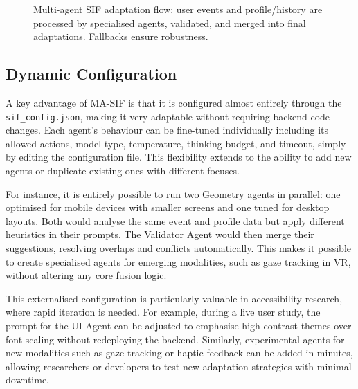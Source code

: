 \begin{figure}[ht]
\caption{Multi-agent SIF adaptation flow: user events and profile/history are processed by specialised agents, validated, and merged into final adaptations. Fallbacks ensure robustness.}
\label{fig:ma-sif-flow}
\end{figure}

\subsection{Dynamic Configuration}
A key advantage of MA-SIF is that it is configured almost entirely through the \texttt{sif\_config.json}, making it very adaptable without requiring backend code changes. Each agent’s behaviour can be fine-tuned individually including its allowed actions, model type, temperature, thinking budget, and timeout, simply by editing the configuration file. This flexibility extends to the ability to add new agents or duplicate existing ones with different focuses.

For instance, it is entirely possible to run two Geometry agents in parallel: one optimised for mobile devices with smaller screens and one tuned for desktop layouts. Both would analyse the same event and profile data but apply different heuristics in their prompts. The Validator Agent would then merge their suggestions, resolving overlaps and conflicts automatically. This makes it possible to create specialised agents for emerging modalities, such as gaze tracking in VR, without altering any core fusion logic.

This externalised configuration is particularly valuable in accessibility research, where rapid iteration is needed. 
For example, during a live user study, the prompt for the UI Agent can be adjusted to emphasise high-contrast themes over font scaling without redeploying the backend. 
Similarly, experimental agents for new modalities such as gaze tracking or haptic feedback can be added in minutes, allowing researchers or developers to test new adaptation strategies with minimal downtime.

